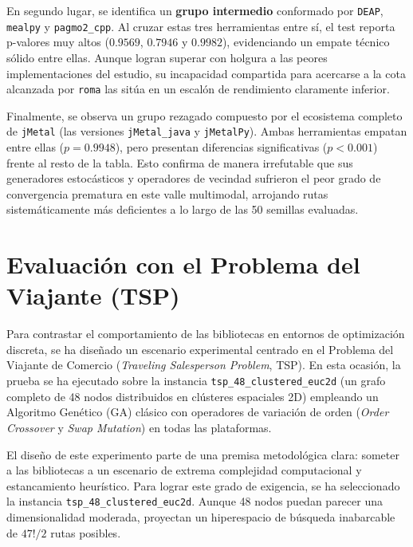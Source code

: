 \documentclass[12pt,a4paper,twoside,openright]{book}
\begin{document}
    En segundo lugar, se identifica un \textbf{grupo intermedio} conformado por \texttt{DEAP}, \texttt{mealpy} y \texttt{pagmo2\_cpp}. Al cruzar estas tres herramientas entre sí, el test reporta p-valores muy altos ($0.9569$, $0.7946$ y $0.9982$), evidenciando un empate técnico sólido entre ellas. Aunque logran superar con holgura a las peores implementaciones del estudio, su incapacidad compartida para acercarse a la cota alcanzada por \texttt{roma} las sitúa en un escalón de rendimiento claramente inferior.

    Finalmente, se observa un grupo rezagado compuesto por el ecosistema completo de \texttt{jMetal} (las versiones \texttt{jMetal\_java} y \texttt{jMetalPy}). Ambas herramientas empatan entre ellas ($p = 0.9948$), pero presentan diferencias significativas ($p < 0.001$) frente al resto de la tabla. Esto confirma de manera irrefutable que sus generadores estocásticos y operadores de vecindad sufrieron el peor grado de convergencia prematura en este valle multimodal, arrojando rutas sistemáticamente más deficientes a lo largo de las 50 semillas evaluadas.



\section{Evaluación con el Problema del Viajante (TSP)}
    Para contrastar el comportamiento de las bibliotecas en entornos de optimización discreta, se ha diseñado un escenario experimental centrado en el Problema del Viajante de Comercio (\textit{Traveling Salesperson Problem}, TSP). En esta ocasión, la prueba se ha ejecutado sobre la instancia \texttt{tsp\_48\_clustered\_euc2d} (un grafo completo de 48 nodos distribuidos en clústeres espaciales 2D) empleando un Algoritmo Genético (GA) clásico con operadores de variación de orden (\textit{Order Crossover} y \textit{Swap Mutation}) en todas las plataformas.

    El diseño de este experimento parte de una premisa metodológica clara: someter a las bibliotecas a un escenario de extrema complejidad computacional y estancamiento heurístico. Para lograr este grado de exigencia, se ha seleccionado la instancia \texttt{tsp\_48\_clustered\_euc2d}. Aunque 48 nodos puedan parecer una dimensionalidad moderada, proyectan un hiperespacio de búsqueda inabarcable de $47! / 2$ rutas posibles. 
\end{document}
